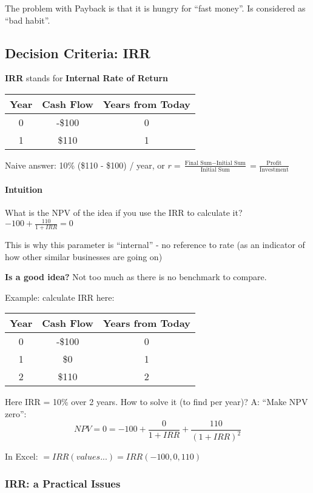 \documentclass{scrartcl}
\begin{document}
The problem with Payback is that it is hungry for ``fast money''. Is considered
as ``bad habit''.

\subsection{Decision Criteria: IRR}
\label{sec:4-6}

{\bf IRR} stands for {\bf Internal Rate of Return}

\begin{tabular}{c|c|c}
  Year & Cash Flow & Years from Today \\
  \hline
  0 & -\$100 & 0  \\
  1 & \$110 & 1 \\
\end{tabular}

Naive answer: 10\% (\$110 - \$100) / year, or $r = \frac{\text{Final Sum} -
  \text{Initial Sum}}{\text{Initial Sum}} =  \frac{\text{Profit}} {\text{Investment}}$

\paragraph{Intuition } What is the NPV of the idea if you use the IRR to
calculate it?$-100 + \frac{110}{1 + IRR} = 0$

This is why this parameter is ``internal'' - no reference to rate (as an
indicator of how other similar businesses are going on)

{\bf Is a good idea?} Not too much as there is no benchmark to compare.

Example: calculate IRR here:
\begin{tabular}{c|c|c}
  Year & Cash Flow & Years from Today \\
  \hline
  0 & -\$100 & 0  \\
  1 & \$0 & 1 \\
  2 & \$110 & 2 \\
\end{tabular}

Here IRR = 10\% over 2 years. How to solve it (to find per year)? A: ``Make NPV
zero'':$$NPV=0=-100+\frac0{1+IRR} + \frac{110}{(1+IRR)^2}$$

In Excel: $=IRR(values...) = IRR(-100, 0, 110)$

\subsubsection{IRR: a Practical Issues}
\label{sec:4-7}
\end{document}
